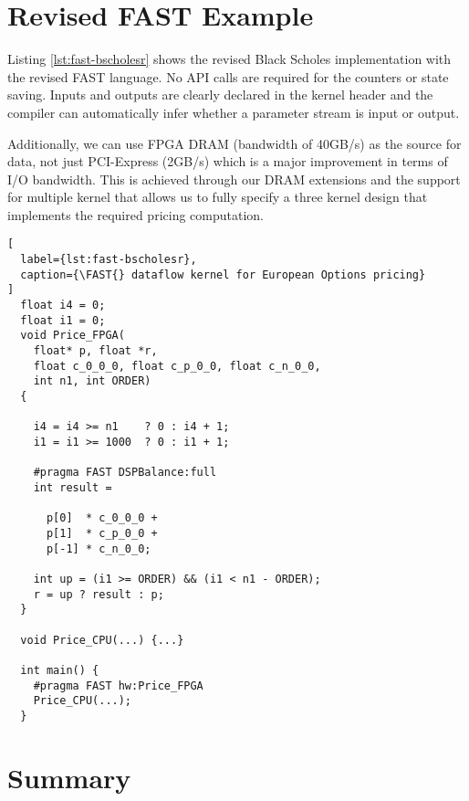 \section{Revised FAST Example}
\label{sec:fast-ref}

Listing \ref{lst:fast-bscholesr} shows the revised Black Scholes
implementation with the revised FAST language. No API calls are
required for the counters or state saving. Inputs and outputs are
clearly declared in the kernel header and the compiler can
automatically infer whether a parameter stream is input or output.

Additionally, we can use FPGA DRAM (bandwidth of 40GB/s) as the source
for data, not just PCI-Express (2GB/s) which is a major improvement in
terms of I/O bandwidth. This is achieved through our DRAM extensions
and the support for multiple kernel that allows us to fully specify a
three kernel design that implements the required pricing computation.

\lstset{style=MaxC}

\begin{lstlisting}[
  label={lst:fast-bscholesr},
  caption={\FAST{} dataflow kernel for European Options pricing}
]
  float i4 = 0;
  float i1 = 0;
  void Price_FPGA(
    float* p, float *r,
    float c_0_0_0, float c_p_0_0, float c_n_0_0,
    int n1, int ORDER)
  {

    i4 = i4 >= n1    ? 0 : i4 + 1;
    i1 = i1 >= 1000  ? 0 : i1 + 1;

    #pragma FAST DSPBalance:full
    int result =

      p[0]  * c_0_0_0 +
      p[1]  * c_p_0_0 +
      p[-1] * c_n_0_0;

    int up = (i1 >= ORDER) && (i1 < n1 - ORDER);
    r = up ? result : p;
  }

  void Price_CPU(...) {...}

  int main() {
    #pragma FAST hw:Price_FPGA
    Price_CPU(...);
  }
\end{lstlisting}


\section{Summary}
